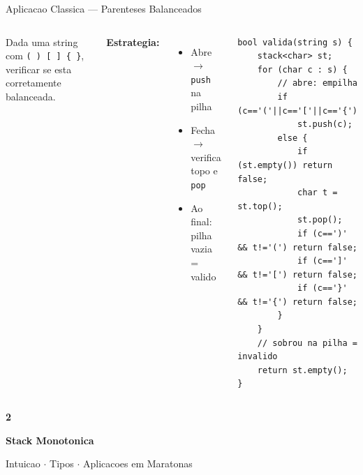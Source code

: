 \documentclass[aspectratio=169,11pt]{beamer}
\begin{document}
\begin{frame}[fragile,shrink=8]{Aplicacao Classica --- Parenteses Balanceados}
  \begin{columns}[c]
      \begin{tcolorbox}[caixaAzul,title={Problema}]
        \small Dada uma string com \texttt{( ) [ ] \{ \}},
        verificar se esta corretamente balanceada.
      \end{tcolorbox}
      \vspace{0.15cm}
      \textbf{Estrategia:}
      \begin{itemize}\small
        \item Abre $\to$ \texttt{push} na pilha
        \item Fecha $\to$ verifica topo e \texttt{pop}
        \item Ao final: pilha vazia = valido
      \end{itemize}
      \vspace{0.15cm}
      \begin{tcolorbox}[caixaCodigo]
        \begin{lstlisting}[style=cppcompact]
bool valida(string s) {
    stack<char> st;
    for (char c : s) {
        // abre: empilha
        if (c=='('||c=='['||c=='{')
            st.push(c);
        else {
            if (st.empty()) return false;
            char t = st.top();
            st.pop();
            if (c==')' && t!='(') return false;
            if (c==']' && t!='[') return false;
            if (c=='}' && t!='{') return false;
        }
    }
    // sobrou na pilha = invalido
    return st.empty();
}
        \end{lstlisting}
      \end{tcolorbox}
  \end{columns}
\end{frame}

{
\begin{frame}[noframenumbering]
  \centering\vspace{1.2cm}
  {\fontsize{40}{48}\selectfont\bfseries\color{gemaBlue} 2}\par
  \vspace{0.3cm}
  {\Large\color{gemaCyan}\bfseries Stack Monotonica}\par
  \vspace{0.2cm}
  {\color{gray}\small Intuicao $\cdot$ Tipos $\cdot$ Aplicacoes em Maratonas}
\end{frame}
}
\end{document}
